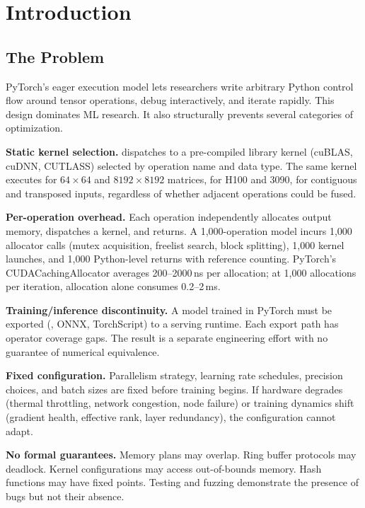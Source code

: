 
\section{Introduction}

\subsection{The Problem}

PyTorch's eager execution model lets researchers write arbitrary Python control flow around tensor operations, debug interactively, and iterate rapidly.
This design dominates ML research.
It also structurally prevents several categories of optimization.

\textbf{Static kernel selection.}
 dispatches to a pre-compiled library kernel (cuBLAS, cuDNN, CUTLASS) selected by operation name and data type.
The same kernel executes for $64 \times 64$ and $8192 \times 8192$ matrices, for H100 and 3090, for contiguous and transposed inputs, regardless of whether adjacent operations could be fused.

\textbf{Per-operation overhead.}
Each operation independently allocates output memory, dispatches a kernel, and returns.
A 1,000-operation model incurs 1,000 allocator calls (mutex acquisition, freelist search, block splitting), 1,000 kernel launches, and 1,000 Python-level returns with reference counting.
PyTorch's CUDACachingAllocator averages 200--2000\,ns per allocation; at 1,000 allocations per iteration, allocation alone consumes 0.2--2\,ms.

\textbf{Training/inference discontinuity.}
A model trained in PyTorch must be exported (, ONNX, TorchScript) to a serving runtime.
Each export path has operator coverage gaps.
The result is a separate engineering effort with no guarantee of numerical equivalence.

\textbf{Fixed configuration.}
Parallelism strategy, learning rate schedules, precision choices, and batch sizes are fixed before training begins.
If hardware degrades (thermal throttling, network congestion, node failure) or training dynamics shift (gradient health, effective rank, layer redundancy), the configuration cannot adapt.

\textbf{No formal guarantees.}
Memory plans may overlap.
Ring buffer protocols may deadlock.
Kernel configurations may access out-of-bounds memory.
Hash functions may have fixed points.
Testing and fuzzing demonstrate the presence of bugs but not their absence.

